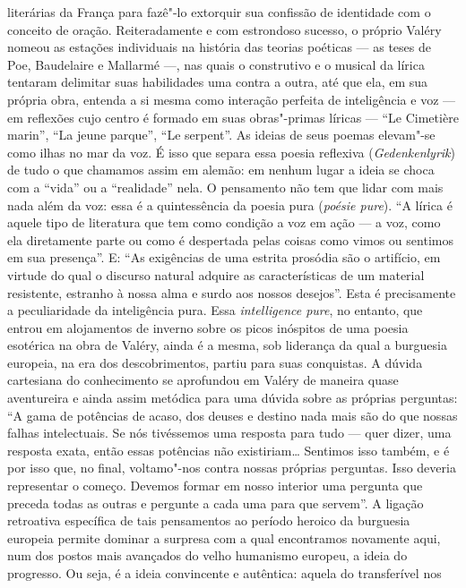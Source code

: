 literárias da França para fazê"-lo extorquir sua confissão de identidade
com o conceito de oração. Reiteradamente e com estrondoso sucesso, o
próprio Valéry nomeou as estações individuais na história das teorias
poéticas --- as teses de Poe, Baudelaire e Mallarmé ---, nas quais o
construtivo e o musical da lírica tentaram delimitar suas habilidades
uma contra a outra, até que ela, em sua própria obra, entenda a si mesma
como interação perfeita de inteligência e voz --- em reflexões cujo centro
é formado em suas obras"-primas líricas --- ``Le Cimetière marin'', ``La jeune
parque'', ``Le serpent''. As ideias de seus poemas elevam"-se como ilhas no
mar da voz. É isso que separa essa poesia reflexiva
(\emph{Gedenkenlyrik}) de tudo o que chamamos assim em alemão: em nenhum
lugar a ideia se choca com a ``vida'' ou a ``realidade'' nela. O pensamento
não tem que lidar com mais nada além da voz: essa é a quintessência da
poesia pura (\emph{poésie pure}). ``A lírica é aquele tipo de literatura
que tem como condição a voz em ação --- a voz, como ela diretamente parte
ou como é despertada pelas coisas como vimos ou sentimos em sua
presença''. E: ``As exigências de uma estrita prosódia são o artifício, em
virtude do qual o discurso natural adquire as características de um
material resistente, estranho à nossa alma e surdo aos nossos desejos''.
Esta é precisamente a peculiaridade da inteligência pura. Essa
\emph{intelligence pure}, no entanto, que entrou em alojamentos de
inverno sobre os picos inóspitos de uma poesia esotérica na obra de
Valéry, ainda é a mesma, sob liderança da qual a burguesia europeia, na
era dos descobrimentos, partiu para suas conquistas. A dúvida cartesiana
do conhecimento se aprofundou em Valéry de maneira quase aventureira e
ainda assim metódica para uma dúvida sobre as próprias perguntas: ``A
gama de potências de acaso, dos deuses e destino nada mais são do que
nossas falhas intelectuais. Se nós tivéssemos uma resposta para tudo ---
quer dizer, uma resposta exata, então essas potências não existiriam\ldots{}
Sentimos isso também, e é por isso que, no final, voltamo"-nos contra
nossas próprias perguntas. Isso deveria representar o começo. Devemos
formar em nosso interior uma pergunta que preceda todas as outras e
pergunte a cada uma para que servem''. A ligação retroativa específica
de tais pensamentos ao período heroico da burguesia europeia permite
dominar a surpresa com a qual encontramos novamente aqui, num dos postos
mais avançados do velho humanismo europeu, a ideia do progresso. Ou
seja, é a ideia convincente e autêntica: aquela do transferível nos
